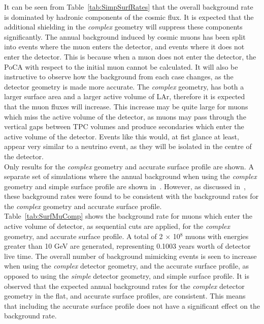 It can be seen from Table~\ref{tab:SimpSurfRates} that the overall background rate is dominated by hadronic components of the cosmic flux. It is expected that the additional shielding in the \emph{complex} geometry will suppress these components significantly. The annual background induced by cosmic muons has been split into events where the muon enters the detector, and events where it does not enter the detector. This is because when a muon does not enter the detector, the PoCA with respect to the initial muon cannot be calculated. It will also be instructive to observe how the background from each case changes, as the detector geometry is made more accurate. The \emph{complex} geometry, has both a larger surface area and a larger active volume of LAr, therefore it is expected that the muon fluxes will increase. This increase may be quite large for muons which miss the active volume of the detector, as muons may pass through the vertical gaps between TPC volumes and produce secondaries which enter the active volume of the detector. Events like this would, at fist glance at least, appear very similar to a neutrino event, as they will be isolated in the centre of the detector. \\

Only results for the \emph{complex} geometry and accurate surface profile are shown. A separate set of simulations where the annual background when using the \emph{complex} geometry and simple surface profile are shown in~\citep{MartinsThesis}. However, as discussed in~\citep{MartinsThesis}, these background rates were found to be consistent with the background rates for the \emph{complex} geometry and accurate surface profile. \\

Table~\ref{tab:SurfMuComp} shows the background rate for muons which enter the active volume of detector, as sequential cuts are applied, for the \emph{complex} geometry, and accurate surface profile. A total of 2 $\times$ 10$^8$ muons with energies greater than 10 GeV are generated, representing 0.1003 years worth of detector live time. The overall number of background mimicking events is seen to increase when using the \emph{complex} detector geometry, and the accurate surface profile, as opposed to using the \emph{simple} detector geometry, and simple surface profile. It is observed that the expected annual background rates for the \emph{complex} detector geometry in the flat, and accurate surface profiles, are consistent. This means that including the accurate surface profile does not have a significant effect on the background rate. \\

